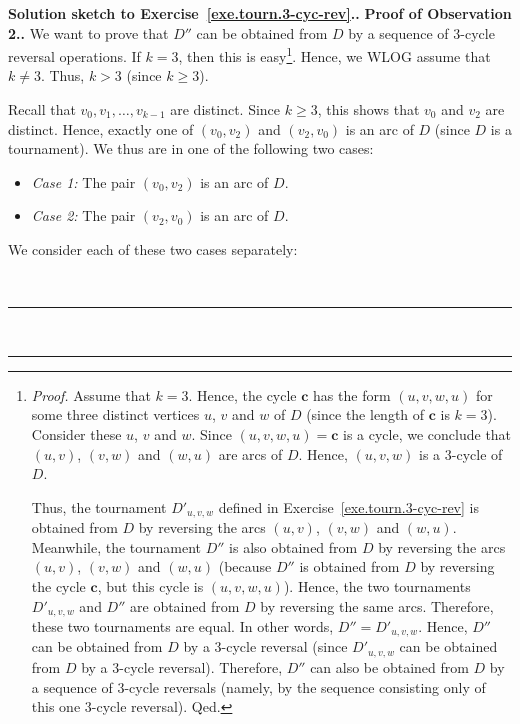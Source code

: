 \documentclass[numbers=enddot,12pt,final,onecolumn,notitlepage]{scrartcl}%
\theoremstyle{definition}
\newenvironment{proof}[1][Proof]{\noindent\textbf{#1.} }{\ \rule{0.5em}{0.5em}}
\newcommand{\tup}[1]{\left( #1 \right)}
\begin{document}
\begin{proof}[Solution sketch to Exercise~\ref{exe.tourn.3-cyc-rev}.]
\begin{proof}[Proof of Observation 2.]
We want to prove that $D''$ can be obtained from $D$ by a sequence of
$3$-cycle reversal operations.
If $k = 3$, then this is
easy\footnote{\textit{Proof.} Assume that $k = 3$. Hence, the cycle
$\mathbf{c}$ has the form $\tup{u, v, w, u}$ for some three distinct
vertices $u$, $v$ and $w$ of $D$ (since the length of $\mathbf{c}$ is
$k = 3$). Consider these $u$, $v$ and $w$. Since
$\tup{u, v, w, u} = \mathbf{c}$ is a cycle, we conclude that
$\tup{u, v}$, $\tup{v, w}$ and $\tup{w, u}$ are arcs of $D$. Hence,
$\tup{u, v, w}$ is a $3$-cycle of $D$.

Thus, the tournament $D'_{u, v, w}$ defined in
Exercise~\ref{exe.tourn.3-cyc-rev} is obtained from $D$ by reversing
the arcs $\tup{u, v}$, $\tup{v, w}$ and $\tup{w, u}$. Meanwhile, the
tournament $D''$ is also obtained from $D$ by reversing
the arcs $\tup{u, v}$, $\tup{v, w}$ and $\tup{w, u}$ (because $D''$
is obtained from $D$ by reversing the cycle $\mathbf{c}$, but this
cycle is $\tup{u, v, w, u}$). Hence, the two tournaments
$D'_{u, v, w}$ and $D''$ are obtained from $D$ by reversing the same
arcs. Therefore, these two tournaments are equal. In other words,
$D'' = D'_{u, v, w}$. Hence, $D''$ can be obtained from $D$ by a
$3$-cycle reversal (since $D'_{u, v, w}$ can be obtained from $D$ by a
$3$-cycle reversal). Therefore, $D''$ can also be obtained
from $D$ by a sequence of $3$-cycle reversals (namely, by the sequence
consisting only of this one $3$-cycle reversal). Qed.}. Hence, we
WLOG assume that $k \neq 3$. Thus, $k > 3$ (since $k \geq 3$).

Recall that $v_0, v_1, \ldots, v_{k-1}$ are distinct. Since
$k \geq 3$, this shows that $v_0$ and $v_2$ are distinct. Hence,
exactly one of $\tup{v_0, v_2}$ and $\tup{v_2, v_0}$ is an arc of $D$
(since $D$ is a tournament). We thus are in one of the following two
cases:

\begin{itemize}
\item \textit{Case 1:} The pair $\tup{v_0, v_2}$ is an arc of $D$.
\item \textit{Case 2:} The pair $\tup{v_2, v_0}$ is an arc of $D$.
\end{itemize}

We consider each of these two cases separately:


\end{proof}
\end{proof}
\end{document}
